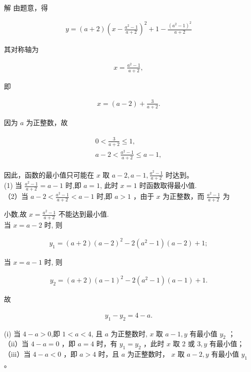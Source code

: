 \documentclass[10pt]{article}
\begin{document}
解 由题意，得

\begin{align*}
y=(a+2)\left(x-\frac{a^{2}-1}{a+2}\right)^{2}+1-\frac{\left(a^{2}-1\right)^{2}}{a+2}
\end{align*}

其对称轴为

\begin{align*}
x=\frac{a^{2}-1}{a+2},
\end{align*}

即

\begin{align*}
x=(a-2)+\frac{3}{a+2} .
\end{align*}

因为 $a$ 为正整数，故

\begin{align*}
\begin{gathered}
0<\frac{3}{a+2} \leqslant 1, \\
a-2<\frac{a^{2}-1}{a+2} \leqslant a-1,
\end{gathered}
\end{align*}

因此，函数的最小值只可能在 $x$ 取 $a-2, a-1, \frac{a^{2}-1}{a+2}$ 时达到。\\
(1) 当 $\frac{a^{2}-1}{a+2}=a-1$ 时,即 $a=1$, 此时 $x=1$ 时函数取得最小值.\\
（2）当 $a-2<\frac{a^{2}-1}{a+2}<a-1$ 时,即 $a>1$ ，由于 $x$ 为正整数，而 $\frac{a^{2}-1}{a+2}$ 为

小数,故 $x=\frac{a^{2}-1}{a+2}$ 不能达到最小值.\\
当 $x=a-2$ 时, 则

\begin{align*}
y_{1}=(a+2)(a-2)^{2}-2\left(a^{2}-1\right)(a-2)+1 ;
\end{align*}

当 $x=a-1$ 时, 则

\begin{align*}
y_{2}=(a+2)(a-1)^{2}-2\left(a^{2}-1\right)(a-1)+1 .
\end{align*}

故

\begin{align*}
y_{1}-y_{2}=4-a .
\end{align*}

(i) 当 $4-a>0$,即 $1<a<4$, 且 $a$ 为正整数时, $x$ 取 $a-1, y$ 有最小值 $y_{2}$ ；\\
（ii）当 $4-a=0$ ，即 $a=4$ 时，有 $y_{1}=y_{2}$ ，此时 $x$ 取 2 或 $3, y$ 有最小值；\\
（iii）当 $4-a<0$ ，即 $a>4$ 时，且 $a$ 为正整数时， $x$ 取 $a-2, y$ 有最小值 $y_{1}$ 。
\end{document}
